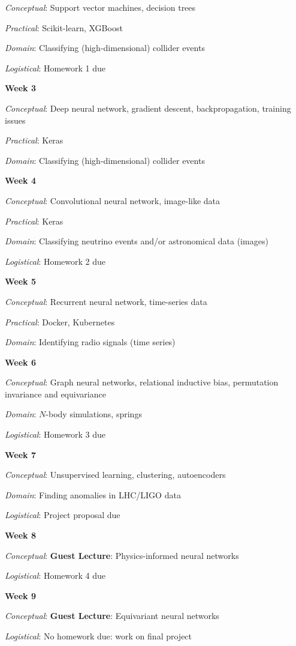 \documentclass[12pt]{article}
\begin{document}
\emph{Conceptual}: Support vector machines, decision trees

\emph{Practical}: Scikit-learn, XGBoost

\emph{Domain}: Classifying (high-dimensional) collider events

\emph{Logistical}: Homework 1 due

\textbf{Week 3}

\emph{Conceptual}: Deep neural network, gradient descent, backpropagation, training issues

\emph{Practical}: Keras

\emph{Domain}: Classifying (high-dimensional) collider events

\textbf{Week 4}

\emph{Conceptual}: Convolutional neural network, image-like data

\emph{Practical}: Keras

\emph{Domain}: Classifying neutrino events and/or astronomical data (images)

\emph{Logistical}: Homework 2 due

\textbf{Week 5}

\emph{Conceptual}: Recurrent neural network, time-series data

\emph{Practical}: Docker, Kubernetes

\emph{Domain}: Identifying radio signals (time series)

\textbf{Week 6}

\emph{Conceptual}: Graph neural networks, relational inductive bias, permutation invariance and equivariance

\emph{Domain}: $N$-body simulations, springs

\emph{Logistical}: Homework 3 due

\textbf{Week 7}

\emph{Conceptual}: Unsupervised learning, clustering, autoencoders

\emph{Domain}: Finding anomalies in LHC/LIGO data

\emph{Logistical}: Project proposal due

\textbf{Week 8}

\emph{Conceptual}: \textbf{Guest Lecture}: Physics-informed neural networks

\emph{Logistical}: Homework 4 due

\textbf{Week 9}

\emph{Conceptual}: \textbf{Guest Lecture}: Equivariant neural networks

\emph{Logistical}: No homework due: work on final project
\end{document}
